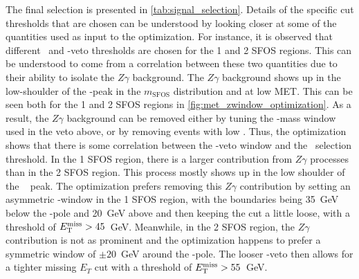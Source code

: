 The final selection is presented in \tab\ref{tab:signal_selection}.
Details of the specific cut thresholds that are chosen can be understood
by looking closer at some of the quantities used as input to 
the optimization. For instance, it is observed that
different \MET~and \z-veto thresholds are chosen for the 1 and 2 SFOS
regions. This can be understood to come from a correlation between
these two quantities due to their ability to isolate the $Z\gamma$
background.
The $Z\gamma$ background shows up in the low-shoulder of the \z-peak
in the $m_{\textrm{SFOS}}$ distribution and at low MET. This can be
seen both for the 1 and 2 SFOS regions in \fig\ref{fig:met_zwindow_optimization}.
As a result, the $Z\gamma$ background can be removed either by tuning 
the \z-mass window used in the veto above, or by removing events with low \met.
Thus, the optimization shows that there is some correlation 
between the \z-veto window and the \met~selection threshold. 
In the 1 SFOS region, there is a larger 
contribution from $Z\gamma$ processes than in the 2 SFOS
region.  This process mostly shows up in the low shoulder 
of the \z~ peak. The optimization
prefers removing this $Z\gamma$ contribution by setting an 
asymmetric \z-window in the 1 SFOS
region, with the boundaries being 35~GeV below the \z-pole 
and 20~GeV above and then keeping the \MET cut a little loose, with a 
threshold of $E_{\mathrm{T}}^{\mathrm{miss}} > 45$~GeV.  Meanwhile, in the 2 SFOS region,
the $Z\gamma$ contribution is not as prominent and the 
optimization happens to prefer a symmetric
window of $\pm20$~GeV around the \z-pole.  
The looser \z-veto then allows for a tighter
missing $E_{T}$ cut with a threshold of $E_{\mathrm{T}}^{\mathrm{miss}} > 55$~GeV. 

